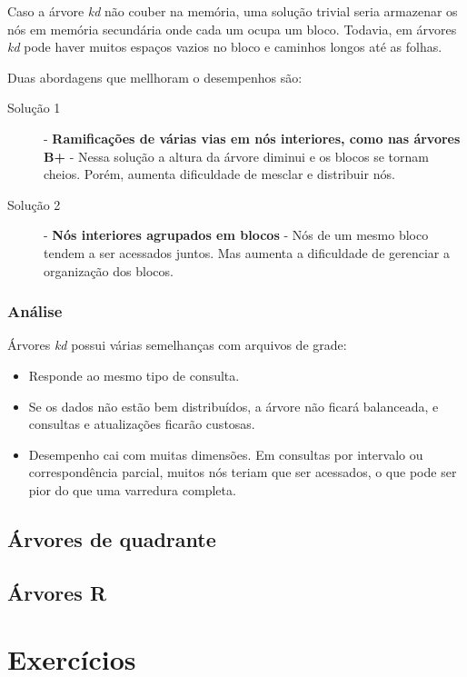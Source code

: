 Caso a árvore \emph{kd} não couber na memória, uma solução trivial seria 
armazenar os nós em memória secundária onde cada um ocupa um bloco.
Todavia, em árvores \emph{kd} pode haver muitos espaços vazios no bloco e caminhos longos
até as folhas.

Duas abordagens que mellhoram o desempenhos são:
\begin{description}
\item[Solução 1] - \textbf{Ramificações de várias vias em nós interiores, como nas árvores B+} - 
Nessa solução a altura da árvore diminui e os blocos se tornam cheios. Porém, aumenta
dificuldade de mesclar e distribuir nós.

\item[Solução 2] - \textbf{Nós interiores agrupados em blocos} - 
Nós de um mesmo bloco tendem a ser acessados juntos. 
Mas aumenta a dificuldade de gerenciar a organização dos blocos.
\end{description}

\subsubsection{Análise}

Árvores \emph{kd} possui várias semelhanças com arquivos de grade:
\begin{itemize}
\item Responde ao mesmo tipo de consulta.
\item Se os dados não estão bem distribuídos, a árvore não ficará balanceada, e consultas
e atualizações ficarão custosas.
\item Desempenho cai com muitas dimensões. Em consultas por intervalo ou
correspondência parcial, muitos nós teriam que ser acessados, o que pode
ser pior do que uma varredura completa.
\end{itemize}

\subsection{Árvores de quadrante}

\subsection{Árvores R}

\section{Exercícios}

